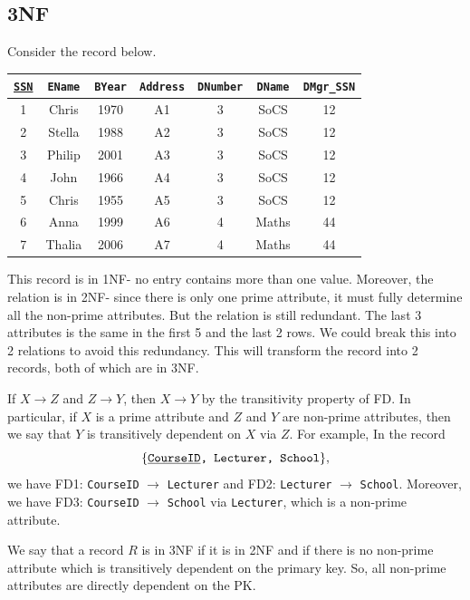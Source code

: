 \documentclass[a4paper, openany]{memoir}
\begin{document}
\subsection{3NF}
Consider the record below.
\begin{table}[H]
    \centering
    \begin{tabular}{|c|c|c|c|c|c|c|}
        \hline
        \texttt{\underline{SSN}} & \texttt{EName} & \texttt{BYear} & \texttt{Address} & \texttt{DNumber} & \texttt{DName} & \texttt{DMgr\_SSN} \\
        \hline
        1 & Chris & 1970 & A1 & 3 & SoCS & 12 \\
        2 & Stella & 1988 & A2 & 3 & SoCS & 12 \\
        3 & Philip & 2001 & A3 & 3 & SoCS & 12 \\
        4 & John & 1966 & A4 & 3 & SoCS & 12 \\
        5 & Chris & 1955 & A5 & 3 & SoCS & 12 \\
        6 & Anna & 1999 & A6 & 4 & Maths & 44 \\
        7 & Thalia & 2006 & A7 & 4 & Maths & 44 \\
        \hline
    \end{tabular}
\end{table}
\noindent This record is in 1NF- no entry contains more than one value. Moreover, the relation is in 2NF- since there is only one prime attribute, it must fully determine all the non-prime attributes. But the relation is still redundant. The last 3 attributes is the same in the first 5 and the last 2 rows. We could break this into 2 relations to avoid this redundancy. This will transform the record into 2 records, both of which are in 3NF.

If $X \to Z$ and $Z \to Y$, then $X \to Y$ by the transitivity property of FD. In particular, if $X$ is a prime attribute and $Z$ and $Y$ are non-prime attributes, then we say that $Y$ is transitively dependent on $X$ via $Z$. For example, In the record
\[\{\texttt{\underline{CourseID}, Lecturer, School}\},\]
we have FD1: \texttt{CourseID} $\to$ \texttt{Lecturer} and FD2: \texttt{Lecturer} $\to$ \texttt{School}. Moreover, we have FD3: \texttt{CourseID} $\to$ \texttt{School} via \texttt{Lecturer}, which is a non-prime attribute.

We say that a record $R$ is in 3NF if it is in 2NF and if there is no non-prime attribute which is transitively dependent on the primary key. So, all non-prime attributes are directly dependent on the PK.
\end{document}
